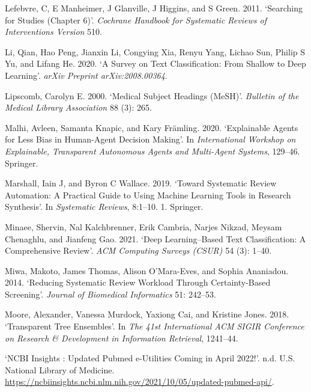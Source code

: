 \documentclass{article}
\newlength{\cslhangindent}
\newlength{\cslentryspacingunit} %
\newenvironment{CSLReferences}[2] %
 {%
  \setlength{\parindent}{0pt}
  \ifodd #1
  \let\oldpar\par
  \def\par{\hangindent=\cslhangindent\oldpar}
  \fi
  \setlength{\parskip}{#2\cslentryspacingunit}
 }%
 {}
\begin{document}
\begin{CSLReferences}{1}{0}
\leavevmode{}%
Lefebvre, C, E Manheimer, J Glanville, J Higgins, and S Green. 2011.
{`Searching for Studies (Chapter 6)'}. \emph{Cochrane Handbook for
Systematic Reviews of Interventions Version} 510.

\leavevmode{}%
Li, Qian, Hao Peng, Jianxin Li, Congying Xia, Renyu Yang, Lichao Sun,
Philip S Yu, and Lifang He. 2020. {`A Survey on Text Classification:
From Shallow to Deep Learning'}. \emph{arXiv Preprint arXiv:2008.00364}.

\leavevmode{}%
Lipscomb, Carolyn E. 2000. {`Medical Subject Headings (MeSH)'}.
\emph{Bulletin of the Medical Library Association} 88 (3): 265.

\leavevmode{}%
Malhi, Avleen, Samanta Knapic, and Kary Främling. 2020. {`Explainable
Agents for Less Bias in Human-Agent Decision Making'}. In
\emph{International Workshop on Explainable, Transparent Autonomous
Agents and Multi-Agent Systems}, 129--46. Springer.

\leavevmode{}%
Marshall, Iain J, and Byron C Wallace. 2019. {`Toward Systematic Review
Automation: A Practical Guide to Using Machine Learning Tools in
Research Synthesis'}. In \emph{Systematic Reviews}, 8:1--10. 1.
Springer.

\leavevmode{}%
Minaee, Shervin, Nal Kalchbrenner, Erik Cambria, Narjes Nikzad, Meysam
Chenaghlu, and Jianfeng Gao. 2021. {`Deep Learning--Based Text
Classification: A Comprehensive Review'}. \emph{ACM Computing Surveys
(CSUR)} 54 (3): 1--40.

\leavevmode{}%
Miwa, Makoto, James Thomas, Alison O'Mara-Eves, and Sophia Ananiadou.
2014. {`Reducing Systematic Review Workload Through Certainty-Based
Screening'}. \emph{Journal of Biomedical Informatics} 51: 242--53.

\leavevmode{}%
Moore, Alexander, Vanessa Murdock, Yaxiong Cai, and Kristine Jones.
2018. {`Transparent Tree Ensembles'}. In \emph{The 41st International
ACM SIGIR Conference on Research \& Development in Information
Retrieval}, 1241--44.

\leavevmode{}%
{`NCBI Insights : Updated Pubmed e-Utilities Coming in April 2022!'}.
n.d. U.S. National Library of Medicine.
\url{https://ncbiinsights.ncbi.nlm.nih.gov/2021/10/05/updated-pubmed-api/}.


\end{CSLReferences}
\end{document}
